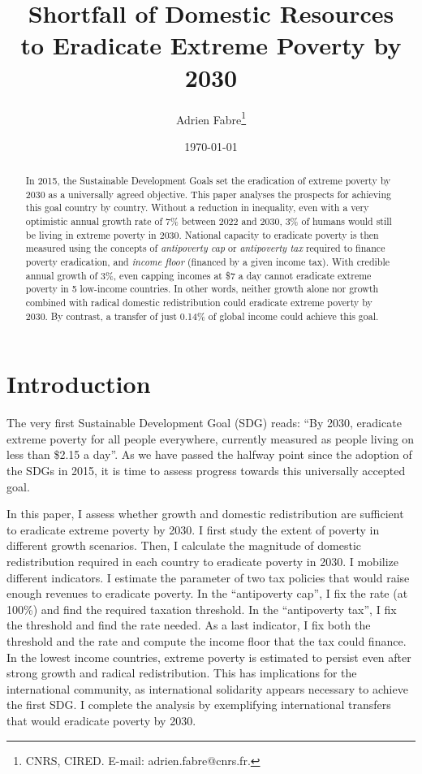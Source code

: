 \documentclass[12pt,english]{article}
\title{Shortfall of Domestic Resources\\ to Eradicate Extreme Poverty by 2030}
\author{Adrien Fabre\footnote{CNRS, CIRED. E-mail: adrien.fabre@cnrs.fr.}}
\date{\today} %
\makeatletter
\renewcommand\tableofcontents{%
    \@starttoc{toc}%
}
\makeatother
\begin{document}
\sloppy
\maketitle




\begin{abstract}
In 2015, the Sustainable Development Goals set the eradication of extreme poverty by 2030 as a universally agreed objective. This paper analyses the prospects for achieving this goal country by country. Without a reduction in inequality, even with a very optimistic annual growth rate of 7\% between 2022 and 2030, 3\% of humans would still be living in extreme poverty in 2030. National capacity to eradicate poverty is then measured using the concepts of \textit{antipoverty cap} or \textit{antipoverty tax} required to finance poverty eradication, and \textit{income floor} (financed by a given income tax). With credible annual growth of 3\%, even capping incomes at \$7 a day cannot eradicate extreme poverty in 5 low-income countries. In other words, neither growth alone nor growth combined with radical domestic redistribution could eradicate extreme poverty by 2030. By contrast, a transfer of just 0.14\% of global income could achieve this goal.
\end{abstract}


\clearpage
\tableofcontents



\section{Introduction}%

The very first Sustainable Development Goal (SDG) %
reads: ``By 2030, eradicate extreme poverty for all people everywhere, currently measured as people living on less than \$2.15 a day''. As we have passed the halfway point since the adoption of the SDGs in 2015, it is time to assess progress towards this universally accepted goal. 

In this paper, I assess whether growth and domestic redistribution are sufficient to eradicate extreme poverty by 2030. I first study the extent of poverty in different growth scenarios. Then, I calculate the magnitude of domestic redistribution required in each country to eradicate poverty in 2030. I mobilize different indicators. I estimate the parameter of two tax policies that would raise enough revenues to eradicate poverty. In the ``antipoverty cap'', I fix the rate (at 100\%) and find the required taxation threshold. In the ``antipoverty tax'', I fix the threshold and find the rate needed. As a last indicator, I fix both the threshold and the rate and compute the income floor that the tax could finance. In the lowest income countries, extreme poverty is estimated to persist even after strong growth and radical redistribution. %
This has implications for the international community, as international solidarity appears necessary to achieve the first SDG. I complete the analysis by exemplifying international transfers that would eradicate poverty by 2030.
\end{document}
